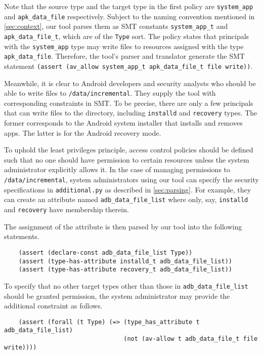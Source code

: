 \documentclass[acmsmall,screen,nonacm]{acmart}
\begin{document}
Note that the source type and the target type in the first policy are 
\texttt{system\_app} and \texttt{apk\_data\_file} respectively. Subject to the 
naming convention mentioned in \autoref{sec:context}, our tool parses them as 
SMT constants \texttt{system\_app\_t} and \texttt{apk\_data\_file\_t}, which 
are of the \texttt{Type} sort. The policy states that principals with the 
\texttt{system\_app} type may write files to resources assigned with the type 
\texttt{apk\_data\_file}. Therefore, the tool's parser and translator generate 
the SMT statement \texttt{(assert (av\_allow system\_app\_t apk\_data\_file\_t 
file write))}.

Meanwhile, it is clear to Android developers and security analysts who should 
be able to write files to \texttt{/data/incremental}. They supply the tool with 
corresponding constraints in SMT. To be precise, there are only a few 
principals that can write files to the directory, including \texttt{installd} 
and \texttt{recovery} types. The former corresponds to the Android system 
installer that installs and removes apps. The latter is for the Android 
recovery mode.

To uphold the least privileges principle, access control policies should be 
defined such that no one should have permission to certain resources unless the 
system administrator explicitly allows it. In the case of managing permissions 
to \texttt{/data/incremental}, system administrators using our tool can specify 
the security specifications in \texttt{additional.py} as described in 
\autoref{sec:parsing}. For example, they can create an attribute named 
\texttt{adb\_data\_file\_list} where only, say, \texttt{installd} and 
\texttt{recovery} have membership therein.

The assignment of the attribute is then parsed by our tool into the following 
statements.
\begin{verbatim}
    (assert (declare-const adb_data_file_list Type))
    (assert (type-has-attribute installd_t adb_data_file_list))
    (assert (type-has-attribute recovery_t adb_data_file_list))
\end{verbatim}

To specify that no other target types other than those in 
\texttt{adb\_data\_file\_list} should be granted permission, the system 
administrator may provide the additional constraint as follows.
\begin{verbatim}
    (assert (forall (t Type) (=> (type_has_attribute t adb_data_file_list)
                                 (not (av-allow t adb_data_file_t file write))))
\end{verbatim}
\end{document}
